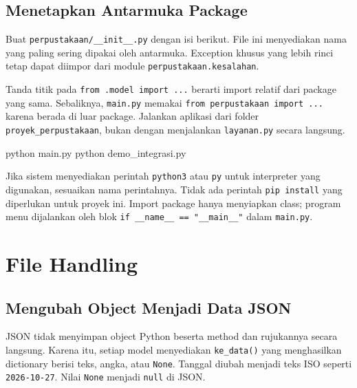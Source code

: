 \subsection{Menetapkan Antarmuka Package}

Buat \texttt{perpustakaan/\_\_init\_\_.py} dengan isi berikut. File ini menyediakan nama yang paling sering dipakai oleh antarmuka. Exception khusus yang lebih rinci tetap dapat diimpor dari module \texttt{perpustakaan.kesalahan}.

\begin{kode}
\end{kode}

Tanda titik pada \texttt{from .model import ...} berarti import relatif dari package yang sama. Sebaliknya, \texttt{main.py} memakai \texttt{from perpustakaan import ...} karena berada di luar package. Jalankan aplikasi dari folder \texttt{proyek\_perpustakaan}, bukan dengan menjalankan \texttt{layanan.py} secara langsung.

\begin{keluaran}
python main.py
python demo_integrasi.py
\end{keluaran}

Jika sistem menyediakan perintah \texttt{python3} atau \texttt{py} untuk interpreter yang digunakan, sesuaikan nama perintahnya. Tidak ada perintah \texttt{pip install} yang diperlukan untuk proyek ini. Import package hanya menyiapkan class; program menu dijalankan oleh blok \texttt{if \_\_name\_\_ == "\_\_main\_\_"} dalam \texttt{main.py}.

\section{File Handling}

\subsection{Mengubah Object Menjadi Data JSON}

JSON tidak menyimpan object Python beserta method dan rujukannya secara langsung. Karena itu, setiap model menyediakan \texttt{ke\_data()} yang menghasilkan dictionary berisi teks, angka, atau \texttt{None}. Tanggal diubah menjadi teks ISO seperti \texttt{2026-10-27}. Nilai \texttt{None} menjadi \texttt{null} di JSON.

